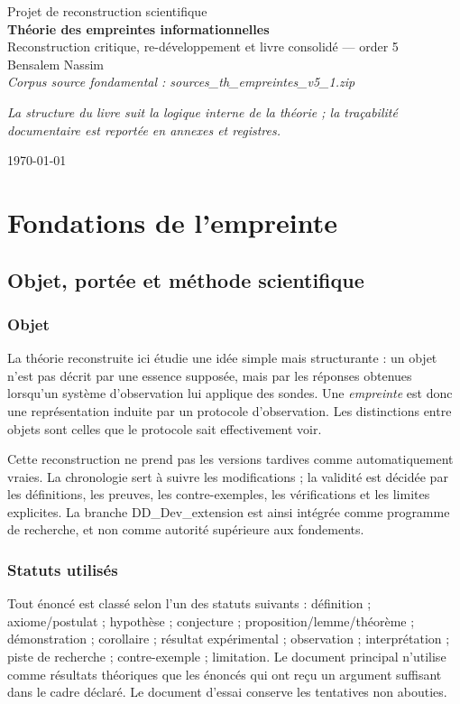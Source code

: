 \documentclass[11pt,a4paper,openany]{book}
\begin{document}
\begin{titlepage}
\centering
{\Large Projet de reconstruction scientifique}\\[1.0cm]
{\Huge\bfseries Théorie des empreintes informationnelles}\\[0.8cm]
{\Large Reconstruction critique, re-développement et livre consolidé — order 5}\\[1.2cm]
{\Large Bensalem Nassim}\\[0.6cm]
\vfill
\textit{Corpus source fondamental : sources\_th\_empreintes\_v5\_1.zip}\par
\textit{La structure du livre suit la logique interne de la théorie ; la traçabilité documentaire est reportée en annexes et registres.}\par
\today
\end{titlepage}
\frontmatter
\tableofcontents
\mainmatter
\part{Fondations de l'empreinte}

\chapter{Objet, portée et méthode scientifique}
\section{Objet}
La théorie reconstruite ici étudie une idée simple mais structurante : un objet n'est pas décrit par une essence supposée, mais par les réponses obtenues lorsqu'un système d'observation lui applique des sondes. Une \emph{empreinte} est donc une représentation induite par un protocole d'observation. Les distinctions entre objets sont celles que le protocole sait effectivement voir.

Cette reconstruction ne prend pas les versions tardives comme automatiquement vraies. La chronologie sert à suivre les modifications ; la validité est décidée par les définitions, les preuves, les contre-exemples, les vérifications et les limites explicites. La branche DD\_Dev\_extension est ainsi intégrée comme programme de recherche, et non comme autorité supérieure aux fondements.

\section{Statuts utilisés}
Tout énoncé est classé selon l'un des statuts suivants : définition ; axiome/postulat ; hypothèse ; conjecture ; proposition/lemme/théorème ; démonstration ; corollaire ; résultat expérimental ; observation ; interprétation ; piste de recherche ; contre-exemple ; limitation. Le document principal n'utilise comme résultats théoriques que les énoncés qui ont reçu un argument suffisant dans le cadre déclaré. Le document d'essai conserve les tentatives non abouties.
\end{document}
